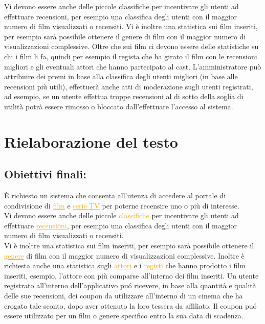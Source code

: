 \documentclass[a4paper,12pt]{report}
\begin{document}
	Vi devono essere anche delle piccole classifiche per incentivare gli utenti ad effettuare recensioni, per esempio una classifica degli utenti con il maggior numero di film visualizzati o recensiti. Vi è inoltre una statistica sui film inseriti, per esempio sarà possibile ottenere il genere di film con il maggior numero di visualizzazioni complessive. Oltre che sui film ci devono essere delle statistiche su chi i film li fa, quindi per esempio il regista che ha girato il film con le recensioni migliori e gli eventuali attori che hanno partecipato al cast. L'amministratore può attribuire dei premi in base alla classifica degli utenti migliori (in base alle recensioni più utili), effettuerà anche atti di moderazione sugli utenti registrati, ad esempio, se un utente effettua troppe recensioni al di sotto della soglia di utilità potrà essere rimosso o bloccato dall'effettuare l'accesso al sistema.
	\section{Rielaborazione del testo}
	\subsection{Obiettivi finali:}
	È richiesto un sistema che consenta all'utenza di accedere al portale di condivisione di \textcolor{orange}{\underline{film}} e \textcolor{orange}{\underline{serie TV}} per poterne recensire uno o più di interesse.\\
	Vi devono essere anche delle piccole \textcolor{orange}{\underline{classifiche}} per incentivare gli utenti ad effettuare \textcolor{orange}{\underline{recensioni}}, per esempio una classifica degli utenti con il maggior numero di film visualizzati o recensiti.\\ 
	Vi è inoltre una statistica sui film inseriti, per esempio sarà possibile ottenere il \textcolor{orange}{\underline{genere}} di film con il maggior numero di visualizzazioni complessive. Inoltre è richiesta anche una statistica sugli \textcolor{orange}{\underline{attori}} e i \textcolor{orange}{\underline{registi}} che hanno prodotto i film inseriti, esempio, l'attore con più comparse all'interno dei film inseriti.
	Un utente registrato all'interno dell'applicativo puó ricevere, in base alla quantità e qualità delle sue recensioni, dei coupon da utilizzare all'interno di un cinema che ha erogato tale sconto, dopo aver ottenuto la loro tessera da affiliato. Il coupon puó essere utilizzato per un film o genere specifico entro la sua data di scadenza.
\end{document}
